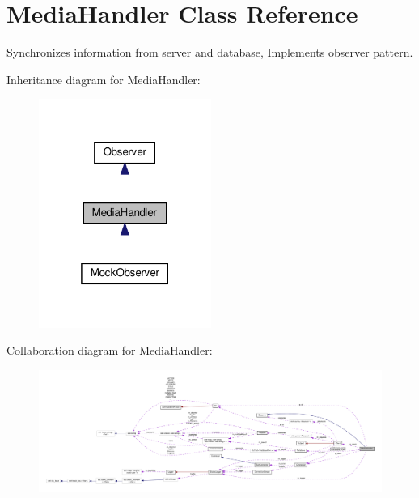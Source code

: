\hypertarget{classMediaHandler}{}\section{Media\+Handler Class Reference}
\label{classMediaHandler}


Synchronizes information from server and database, Implements observer pattern.  




Inheritance diagram for Media\+Handler\+:\nopagebreak
\begin{figure}[H]
\begin{center}
\leavevmode
\includegraphics[width=160pt]{classMediaHandler__inherit__graph}
\end{center}
\end{figure}


Collaboration diagram for Media\+Handler\+:\nopagebreak
\begin{figure}[H]
\begin{center}
\leavevmode
\includegraphics[width=350pt]{classMediaHandler__coll__graph}
\end{center}
\end{figure}

